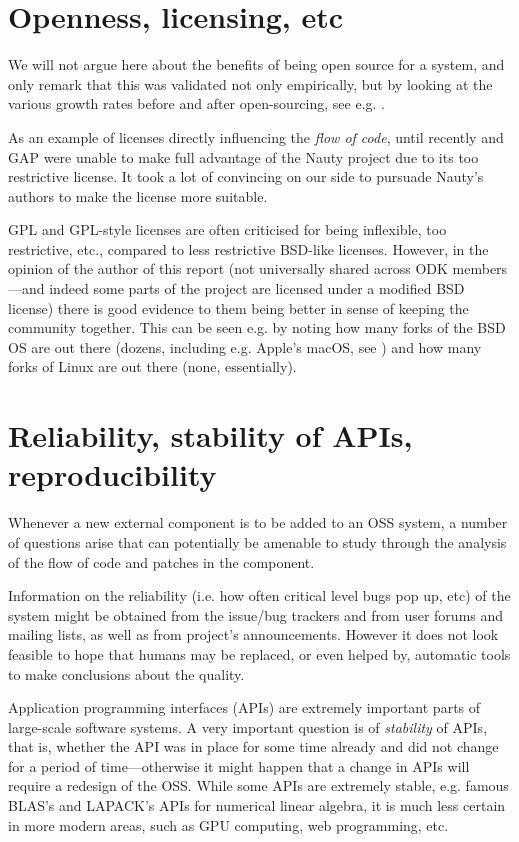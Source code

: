 \documentclass{deliverablereport}
\begin{document}
\section{Openness, licensing, etc}

We will not argue here about the benefits of being open source for a
system, and only remark that this was validated not only empirically,
but by looking at the various growth rates before and after
open-sourcing, see e.g. \cite{wp7:arfonshapeoss}.

As an example of licenses directly influencing the {\em flow of
code}, until recently \Sage and GAP were unable to make full
advantage of the Nauty project \cite{wp7:nauty} due to its too
restrictive license. It took a lot of convincing on our side to
pursuade Nauty's authors to make the license more suitable.

GPL and GPL-style licenses \cite{wp7:gpl} are often criticised
for being inflexible, too restrictive, etc., compared to less
restrictive BSD-like licenses. However, in the opinion of the
author of this report (not universally shared across ODK
members---and indeed some parts of the project are licensed under
a modified BSD license) there is good evidence to them being
better in sense of keeping the community together. This can be
seen e.g. by noting how many forks of the BSD OS are out there
(dozens, including e.g. Apple's macOS, see \cite{wp7:bsdlist})
and how many forks of Linux are out there (none, essentially). 


\section{Reliability, stability of APIs, reproducibility}
Whenever a new external component is to be added to an OSS system,
a number of questions arise that can potentially be amenable to study through the
analysis of the flow of code and patches in the component.

Information on the reliability (i.e. how often critical level
bugs pop up, etc) of the system might be obtained from the issue/bug
trackers and from user forums and mailing lists, as well as from project's
announcements. However it does not look feasible to hope that
humans may be replaced, or even helped by, automatic tools to
make conclusions about the quality.

Application programming interfaces (APIs) are extremely
important parts of large-scale software systems.
A very important question is of {\em stability} of APIs, that is,
whether the API was in place for some time already and did not change
for a period of time---otherwise it might happen that a change in APIs will
require a redesign of the OSS.
While some APIs are extremely stable, e.g. famous BLAS's and LAPACK's
\cite{2002:USB:567806.567807,Anderson:1990:LPL:110382.110385}
APIs for numerical linear algebra, it is much less certain in more
modern areas, such as GPU computing, web programming, etc.
\end{document}

